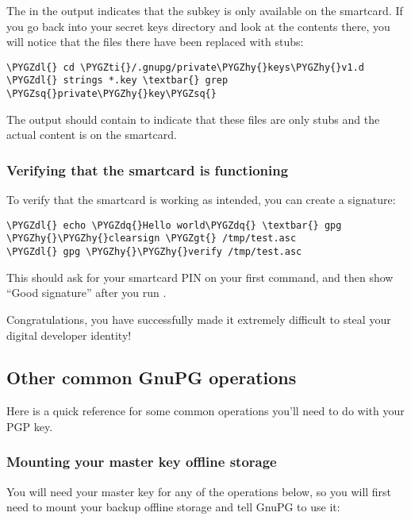 \documentclass[a4paper,8pt,english]{sphinxmanual}
\def\PYGZgt{\char`\>}
\def\PYGZdl{\char`\$}
\def\PYGZhy{\char`\-}
\def\PYGZsq{\char`\'}
\def\PYGZdq{\char`\"}
\def\PYGZti{\char`\~}
\renewcommand\PYGZsq{\textquotesingle}
\begin{document}
The \code{\textgreater{}} in the  output indicates that the subkey is only
available on the smartcard. If you go back into your secret keys
directory and look at the contents there, you will notice that the
 files there have been replaced with stubs:

\begin{Verbatim}[commandchars=\\\{\}]
\PYGZdl{} cd \PYGZti{}/.gnupg/private\PYGZhy{}keys\PYGZhy{}v1.d
\PYGZdl{} strings *.key \textbar{} grep \PYGZsq{}private\PYGZhy{}key\PYGZsq{}
\end{Verbatim}

The output should contain  to indicate that
these files are only stubs and the actual content is on the smartcard.


\subsubsection{Verifying that the smartcard is functioning}
\label{process/maintainer-pgp-guide:verifying-that-the-smartcard-is-functioning}
To verify that the smartcard is working as intended, you can create a
signature:

\begin{Verbatim}[commandchars=\\\{\}]
\PYGZdl{} echo \PYGZdq{}Hello world\PYGZdq{} \textbar{} gpg \PYGZhy{}\PYGZhy{}clearsign \PYGZgt{} /tmp/test.asc
\PYGZdl{} gpg \PYGZhy{}\PYGZhy{}verify /tmp/test.asc
\end{Verbatim}

This should ask for your smartcard PIN on your first command, and then
show ``Good signature'' after you run .

Congratulations, you have successfully made it extremely difficult to
steal your digital developer identity!


\subsection{Other common GnuPG operations}
\label{process/maintainer-pgp-guide:other-common-gnupg-operations}
Here is a quick reference for some common operations you'll need to do
with your PGP key.


\subsubsection{Mounting your master key offline storage}
\label{process/maintainer-pgp-guide:mounting-your-master-key-offline-storage}
You will need your master key for any of the operations below, so you
will first need to mount your backup offline storage and tell GnuPG to
use it:
\end{document}
